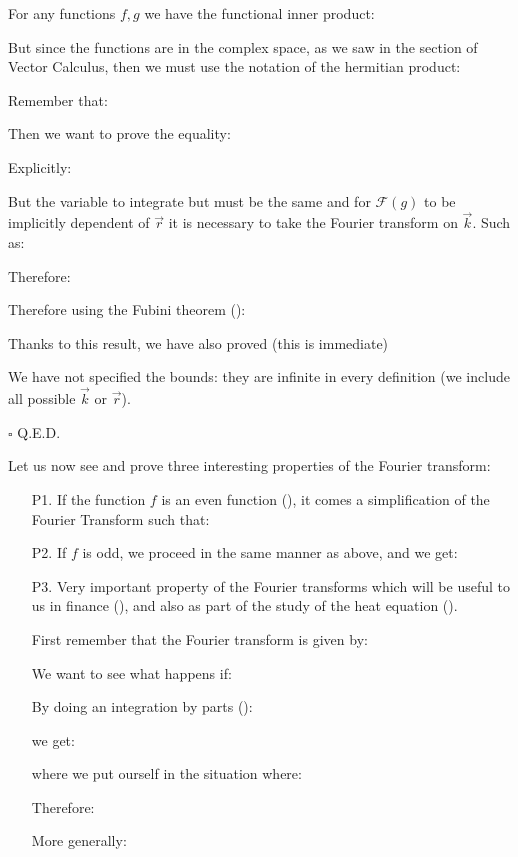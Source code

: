 	\begin{theorem}
	For any functions $f, g$ we have the functional inner product:
	
	But since the functions are in the complex space, as we saw in the section of Vector Calculus, then we must use the notation of the hermitian product:
	
	Remember that:
	
	\end{theorem}
	\begin{dem}
	Then we want to prove the equality:
	
	Explicitly:
	
	But the variable to integrate but must be the same and for $\mathcal{F}(g)$ to be implicitly dependent of $\vec{r}$ it is necessary to take the Fourier transform on $\vec{k}$. Such as:
	
	Therefore:
	
	Therefore using the Fubini theorem ():
	
	Thanks to this result, we have also proved (this is immediate)
	
	We have not specified the bounds: they are infinite in every definition (we include all possible $\vec{k}$ or $\vec{r}$).
	\begin{flushright}
		$\square$  Q.E.D.
	\end{flushright}
	\end{dem}
	Let us now see and prove three interesting properties of the Fourier transform:
	\begin{enumerate}
		\item[P1.] If the function $f$ is an even function (), it comes a simplification of the Fourier Transform such that:
		
		\item[P2.] If $f$ is odd, we proceed in the same manner as above, and we get:
		
		\item[P3.] Very important property of the Fourier transforms which will be useful to us in finance (), and also as part of the study of the heat equation ().
		
		First remember that the Fourier transform is given by:
		
		We want to see what happens if:
		
		By doing an integration by parts ():
		
		we get:
		
		where we put ourself in the situation where:
		
		Therefore:
		
		More generally:
		
	\end{enumerate}
